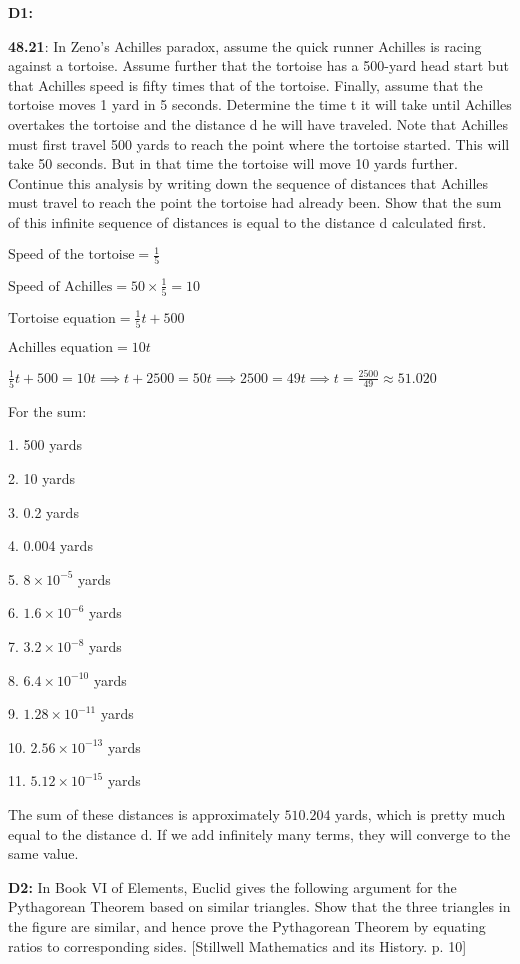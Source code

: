 \documentclass{article}
\begin{document}
\textbf{D1:}

\textbf{48.21}: In Zeno's Achilles paradox, assume the quick runner
Achilles is racing against a tortoise. Assume further that the
tortoise has a 500-yard head start but that Achilles speed is
fifty times that of the tortoise. Finally, assume that the
tortoise moves 1 yard in 5 seconds. Determine the time t
it will take until Achilles overtakes the tortoise and
the distance d he will have traveled. Note that Achilles
must first travel 500 yards to reach the point where the
tortoise started. This will take 50 seconds. But in that
time the tortoise will move 10 yards further. Continue
this analysis by writing down the sequence of distances
that Achilles must travel to reach the point the tortoise
had already been. Show that the sum of this infinite sequence
of distances is equal to the distance d calculated first.

$\text{Speed of the tortoise} = \frac{1}{5}$

$\text{Speed of Achilles} = 50 \times \frac{1}{5} = 10$

$\text{Tortoise equation} = \frac{1}{5} t + 500$

$\text{Achilles equation} = 10 t$

$\frac{1}{5} t + 500 = 10 t \implies t + 2500 = 50 t \implies 2500 = 49 t \implies t = \frac{2500}{49} \approx 51.020$


For the sum:

1. 500 yards

2. 10 yards

3. 0.2 yards

4. 0.004 yards

5. $8 \times 10^{-5}$ yards

6. $1.6 \times 10^{-6}$ yards

7. $3.2 \times 10^{-8}$ yards

8. $6.4 \times 10^{-10}$ yards

9. $1.28 \times 10^{-11}$ yards

10. $2.56 \times 10^{-13}$ yards

11. $5.12 \times 10^{-15}$ yards

The sum of these distances is approximately $510.204$ yards, which is pretty much equal
to the distance d. If we add infinitely many terms, they will converge to the same value.


\textbf{D2:} In Book VI of Elements, Euclid gives the following
argument for the Pythagorean Theorem based on similar triangles.
Show that the three triangles in the figure are similar, and
hence prove the Pythagorean Theorem by equating ratios to
corresponding sides. [Stillwell Mathematics and its History. p. 10]
\end{document}
